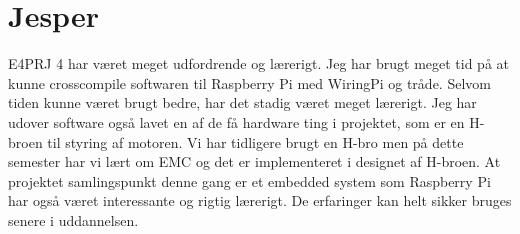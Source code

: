 \section{Jesper} 

E4PRJ 4 har været meget udfordrende og lærerigt. Jeg har brugt meget tid på at kunne crosscompile softwaren til Raspberry Pi med WiringPi og tråde. 
Selvom tiden kunne været brugt bedre, har det stadig været meget lærerigt. 
Jeg har udover software også lavet en af de få hardware ting i projektet, som er en H-broen til styring af motoren. 
Vi har tidligere brugt en H-bro men på dette semester har vi lært om EMC og det er implementeret i designet af H-broen.
At projektet samlingspunkt denne gang er et embedded system som Raspberry Pi har også været interessante og rigtig lærerigt. De erfaringer kan helt sikker bruges senere i uddannelsen.

